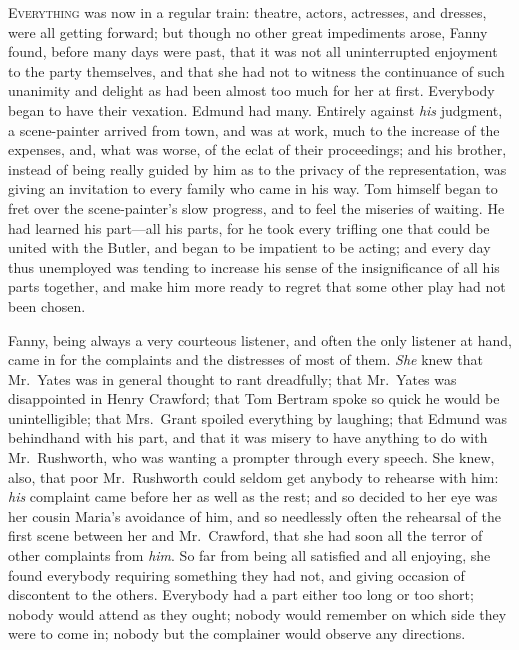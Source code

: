 \documentclass{article}
\newcommand{\gintro}[1]{\textcolor{gcolor}{\textsc{#1}}}
\begin{document}
\gintro{Everything} was now in a regular train:  theatre, actors,
actresses, and dresses, were all getting forward;
but though no other great impediments arose, Fanny found,
before many days were past, that it was not all uninterrupted
enjoyment to the party themselves, and that she had
not to witness the continuance of such unanimity and
delight as had been almost too much for her at first.
Everybody began to have their vexation.  Edmund had many.
Entirely against \emph{his} judgment, a scene-painter arrived
from town, and was at work, much to the increase
of the expenses, and, what was worse, of the eclat of
their proceedings; and his brother, instead of being really
guided by him as to the privacy of the representation,
was giving an invitation to every family who came in his way.
Tom himself began to fret over the scene-painter's
slow progress, and to feel the miseries of waiting.
He had learned his part---all his parts, for he took
every trifling one that could be united with the Butler,
and began to be impatient to be acting; and every day
thus unemployed was tending to increase his sense of
the insignificance of all his parts together, and make
him more ready to regret that some other play had not been chosen.

Fanny, being always a very courteous listener, and often
the only listener at hand, came in for the complaints
and the distresses of most of them.  \emph{She} knew that
Mr.\ Yates was in general thought to rant dreadfully;
that Mr.\ Yates was disappointed in Henry Crawford;
that Tom Bertram spoke so quick he would be unintelligible;
that Mrs.\ Grant spoiled everything by laughing; that Edmund
was behindhand with his part, and that it was misery
to have anything to do with Mr.\ Rushworth, who was wanting
a prompter through every speech.  She knew, also, that poor
Mr.\ Rushworth could seldom get anybody to rehearse with him:
\emph{his} complaint came before her as well as the rest;
and so decided to her eye was her cousin Maria's
avoidance of him, and so needlessly often the rehearsal
of the first scene between her and Mr.\ Crawford, that she
had soon all the terror of other complaints from \emph{him}.
So far from being all satisfied and all enjoying,
she found everybody requiring something they had not,
and giving occasion of discontent to the others.
Everybody had a part either too long or too short;
nobody would attend as they ought; nobody would remember on
which side they were to come in; nobody but the complainer
would observe any directions.
\end{document}
